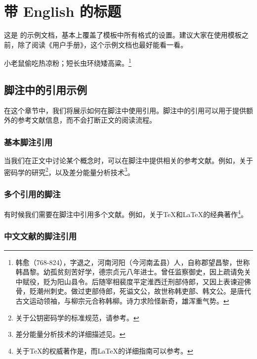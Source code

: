 
\chapter{带 English 的标题}
\label{cha:intro}

这是 \bnuthesis{} 的示例文档，基本上覆盖了模板中所有格式的设置。建议大家在使用模板之前，除了阅读《\bnuthesis{}用户手册》，这个示例文档也最好能看一看。

小老鼠偷吃热凉粉；短长虫环绕矮高粱。\footnote{韩愈（768-824），字退之，河南河阳（今河南孟县）人，自称郡望昌黎，世称韩昌黎。幼孤贫刻苦好学，德宗贞元八年进士。曾任监察御史，因上疏请免关中赋役，贬为阳山县令。后随宰相裴度平定淮西迁刑部侍郎，又因上表谏迎佛骨，贬潮州刺史。做过吏部侍郎，死谥文公，故世称韩吏部、韩文公。是唐代古文运动领袖，与柳宗元合称韩柳。诗力求险怪新奇，雄浑重气势。}

\section{脚注中的引用示例}
\label{sec:footnote-citations}

在这个章节中，我们将展示如何在脚注中使用引用。脚注中的引用可以用于提供额外的参考文献信息，而不会打断正文的阅读流程。

\subsection{基本脚注引用}
\label{subsec:basic-footnote-citations}

当我们在正文中讨论某个概念时，可以在脚注中提供相关的参考文献。例如，关于密码学的研究\footnote{关于公钥密码学的标准规范，请参考\cite{IEEE-1363}。}，以及差分能量分析技术\footnote{差分能量分析技术的详细描述见\cite{kocher99}。}。

\subsection{多个引用的脚注}
\label{subsec:multiple-citations-footnote}

有时候我们需要在脚注中引用多个文献。例如，关于TeX和LaTeX的经典著作\footnote{关于TeX的权威著作是\cite{tex}，而LaTeX的详细指南可以参考\cite{companion}。}。

\subsection{中文文献的脚注引用}
\label{subsec:chinese-citations-footnote}

